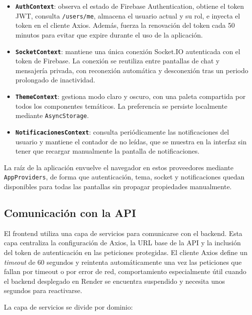 \begin{itemize}
    \item \textbf{\texttt{AuthContext}}: observa el estado de Firebase Authentication, obtiene el token JWT, consulta \texttt{/users/me}, almacena el usuario actual y su rol, e inyecta el token en el cliente Axios. Además, fuerza la renovación del token cada 50 minutos para evitar que expire durante el uso de la aplicación.
    \item \textbf{\texttt{SocketContext}}: mantiene una única conexión Socket.IO autenticada con el token de Firebase. La conexión se reutiliza entre pantallas de chat y mensajería privada, con reconexión automática y desconexión tras un periodo prolongado de inactividad.
    \item \textbf{\texttt{ThemeContext}}: gestiona modo claro y oscuro, con una paleta compartida por todos los componentes temáticos. La preferencia se persiste localmente mediante \texttt{AsyncStorage}.
    \item \textbf{\texttt{NotificacionesContext}}: consulta periódicamente las notificaciones del usuario y mantiene el contador de no leídas, que se muestra en la interfaz sin tener que recargar manualmente la pantalla de notificaciones.
\end{itemize}

La raíz de la aplicación envuelve el navegador en estos proveedores mediante \texttt{AppProviders}, de forma que autenticación, tema, socket y notificaciones quedan disponibles para todas las pantallas sin propagar propiedades manualmente.

\subsection{Comunicación con la API}

El frontend utiliza una capa de servicios para comunicarse con el backend. Esta capa centraliza la configuración de Axios, la URL base de la API y la inclusión del token de autenticación en las peticiones protegidas. El cliente Axios define un \textit{timeout} de 60 segundos y reintenta automáticamente una vez las peticiones que fallan por timeout o por error de red, comportamiento especialmente útil cuando el backend desplegado en Render se encuentra suspendido y necesita unos segundos para reactivarse.

La capa de servicios se divide por dominio:

